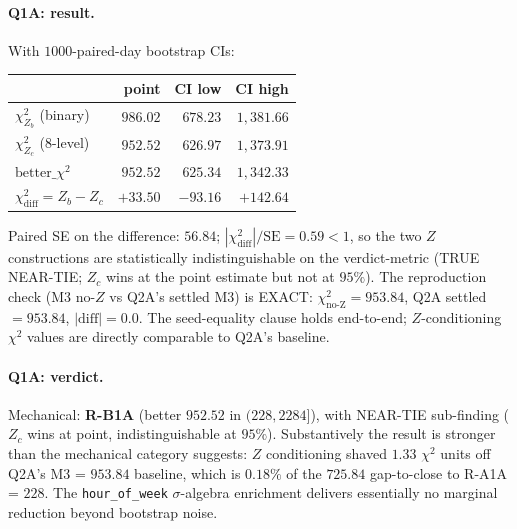 \documentclass[11pt]{article}
\theoremstyle{definition}
\theoremstyle{plain}
\begin{document}
\paragraph{Q1A: result.}
With $1000$-paired-day bootstrap CIs:

\begin{center}
\begin{tabular}{lrrr}
\toprule
& point & CI low & CI high \\
\midrule
$\chi^2_{Z_b}$ (binary)              & $986.02$ & $678.23$ & $1{,}381.66$ \\
$\chi^2_{Z_c}$ ($8$-level)           & $952.52$ & $626.97$ & $1{,}373.91$ \\
$\mathrm{better}\_\chi^2$            & $952.52$ & $625.34$ & $1{,}342.33$ \\
$\chi^2_{\mathrm{diff}} = Z_b - Z_c$ & $+33.50$ & $-93.16$ & $+142.64$ \\
\bottomrule
\end{tabular}
\end{center}

Paired SE on the difference: $56.84$; $|\chi^2_{\mathrm{diff}}|/
\mathrm{SE} = 0.59 < 1$, so the two $Z$ constructions are
statistically indistinguishable on the verdict-metric (TRUE NEAR-TIE;
$Z_c$ wins at the point estimate but not at $95\%$). The
reproduction check (M3 no-$Z$ vs Q2A's settled M3) is EXACT:
$\chi^2_{\mathrm{no\text{-}Z}} = 953.84$, Q2A settled $= 953.84$,
$|\mathrm{diff}| = 0.0$. The seed-equality clause holds end-to-end;
$Z$-conditioning $\chi^2$ values are directly comparable to Q2A's
baseline.

\paragraph{Q1A: verdict.}
Mechanical: \textbf{R-B1A} (better $952.52$ in $(228, 2284]$),
with NEAR-TIE sub-finding ($Z_c$ wins at point, indistinguishable
at $95\%$). Substantively the result is stronger than the
mechanical category suggests: $Z$ conditioning shaved $1.33$
$\chi^2$ units off Q2A's M3 = $953.84$ baseline, which is
$\mathbf{0.18\%}$ of the $725.84$ gap-to-close to R-A1A = $228$.
The \texttt{hour\_of\_week} $\sigma$-algebra enrichment delivers
essentially no marginal reduction beyond bootstrap noise.
\end{document}
